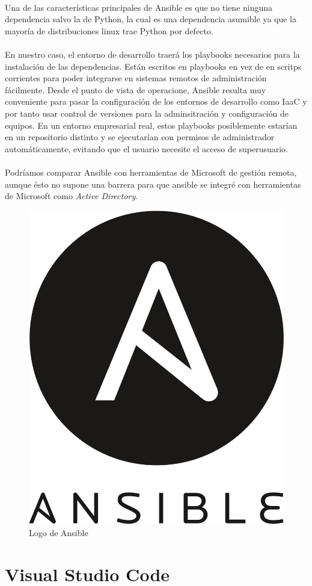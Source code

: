 \paragraph{}Una de las características principales de Ansible es que no tiene ninguna
dependencia salvo la de Python, la cual es una dependencia asumible ya que la mayoría
de distribuciones linux trae Python por defecto.

\paragraph{}En nuestro caso, el entorno de desarrollo traerá los playbooks necesarios
para la instalación de las dependencias. Están escritos en playbooks en vez de en scritps
corrientes para poder integrarse en sistemas remotos de administración fácilmente. Desde
el punto de vista de operacione, Ansible resulta muy conveniente para pasar la configuración
de los entornos de desarrollo como \gls{IaaC} y por tanto usar control de versiones para
la adminsitración y configuración de equipos. En un entorno empresarial real, estos
playbooks posiblemente estarían en un repositorio distinto y se ejecutarían con permisos
de administrador automáticamente, evitando que el usuario necesite el acceso de superusuario.

\paragraph{}Podríamos comparar Ansible con herramientas de Microsoft de gestión remota,
aunque ésto no supone una barrera para que ansible se integré con herramientas de Microsoft
como \emph{Active Directory}.

\begin{figure}[H]
	\centering
	\includegraphics[width=0.30\linewidth]{imgs/ansible-logo}
	\caption[Ansible Logo]{Logo de Ansible}
	\label{fig:ansible}
\end{figure}

\section{Visual Studio Code}\label{sec:vscode}

